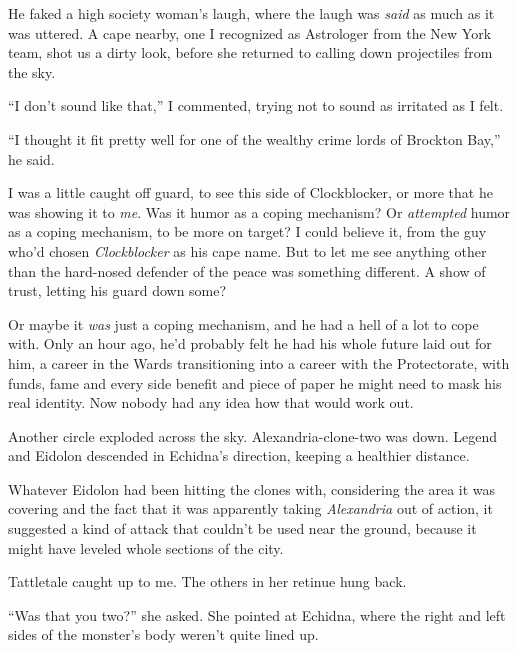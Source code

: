 He faked a high society woman's laugh, where the laugh was \emph{said} as much as it was uttered.  A cape nearby, one I recognized as Astrologer from the New York team, shot us a dirty look, before she returned to calling down projectiles from the sky.



``I don't sound like that,'' I commented, trying not to sound as irritated as I felt.



``I thought it fit pretty well for one of the wealthy crime lords of Brockton Bay,'' he said.



I was a little caught off guard, to see this side of Clockblocker, or more that he was showing it to \emph{me}.  Was it humor as a coping mechanism?  Or \emph{attempted} humor as a coping mechanism, to be more on target?  I could believe it, from the guy who'd chosen \emph{Clockblocker} as his cape name.  But to let me see anything other than the hard-nosed defender of the peace was something different.  A show of trust, letting his guard down some?



Or maybe it \emph{was} just a coping mechanism, and he had a hell of a lot to cope with.  Only an hour ago, he'd probably felt he had his whole future laid out for him, a career in the Wards transitioning into a career with the Protectorate, with funds, fame and every side benefit and piece of paper he might need to mask his real identity.  Now nobody had any idea how that would work out.



Another circle exploded across the sky.  Alexandria-clone-two was down.  Legend and Eidolon descended in Echidna's direction, keeping a healthier distance.



Whatever Eidolon had been hitting the clones with, considering the area it was covering and the fact that it was apparently taking \emph{Alexandria }out of action, it suggested a kind of attack that couldn't be used near the ground, because it might have leveled whole sections of the city.



Tattletale caught up to me.  The others in her retinue hung back.



``Was that you two?'' she asked.  She pointed at Echidna, where the right and left sides of the monster's body weren't quite lined up.



